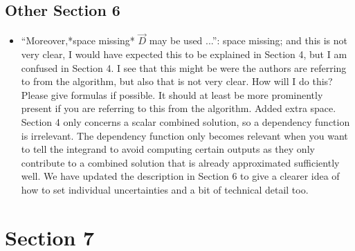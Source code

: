 \documentclass{article}[12pt]
\newcommand{\Referee}[1]{{\color{blue} #1 \newline}}
\begin{document}
\subsection*{Other Section 6}\label{sec:os6}

\begin{itemize}
    \item \Referee{``Moreover,*space missing* $\vec{D}$ may be used ...'': space missing; and this is not very clear, I would have expected this to be explained in Section 4, but I am confused in Section 4. I see that this might be were the authors are referring to from the algorithm, but also that is not very clear. How will I do this? Please give formulas if possible. It should at least be more prominently present if you are referring to this from the algorithm.}Added extra space. Section 4 only concerns a scalar combined solution, so a dependency function is irrelevant. The dependency function only becomes relevant when you want to tell the integrand to avoid computing certain outputs as they only contribute to a combined solution that is already approximated sufficiently well. We have updated the description in Section 6 to give a clearer idea of how to set individual uncertainties and a bit of technical detail too. 
\end{itemize}

\section*{Section 7}
\end{document}
